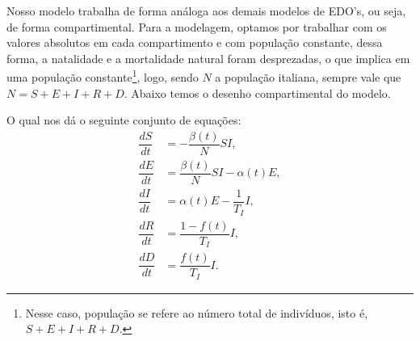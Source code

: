 \documentclass{article}
\begin{document}
Nosso modelo trabalha de forma análoga aos demais modelos de EDO's, ou seja, de forma compartimental. Para a modelagem, optamos por trabalhar com os valores absolutos em cada compartimento e com população constante, dessa forma, a natalidade e a mortalidade natural foram desprezadas, o que implica em uma população constante\footnote{Nesse caso, população se refere ao número total de indivíduos, isto é, $S + E + I + R + D$.}, logo, sendo $N$ a população italiana, sempre vale que $N = S + E + I + R + D$. Abaixo temos o desenho compartimental do modelo.
\begin{center}
\end{center}

O qual nos dá o seguinte conjunto de equações:
\begin{equation}
    \label{fSEIRD}
    \begin{split}
        \dfrac{dS}{dt} & = -\dfrac{\beta(t)}{N}SI, \\
        \dfrac{dE}{dt} & = \dfrac{\beta(t)}{N}SI - \alpha(t) E, \\
        \dfrac{dI}{dt} & = \alpha(t) E - \dfrac{1}{T_I}I, \\
        \dfrac{dR}{dt} & = \dfrac{1 - f(t)}{T_I}I, \\
        \dfrac{dD}{dt} & = \dfrac{f(t)}{T_I}I.
    \end{split}
\end{equation}
\end{document}
